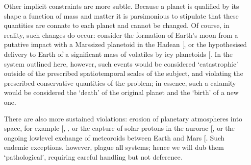 \documentclass[letterpaper,10pt,english]{jupyterBook}
\begin{document}
\sphinxAtStartPar
Other implicit constraints are more subtle. Because a planet is qualified by its shape \sphinxhyphen{} a function of mass and matter \sphinxhyphen{} it is parsimonious to stipulate that these quantities are connate to each planet and cannot be changed. Of course, in reality, such changes do occur: consider the formation of Earth’s moon from a putative impact with a Mars\sphinxhyphen{}sized planetoid in the Hadean {[}\sphinxcite{references:id117}{]}, or the hypothesised delivery to Earth of a significant mass of volatiles by icy planetoids {[}\sphinxcite{references:id116}{]}. In the system outlined here, however, such events would be considered ‘catastrophic’ \sphinxhyphen{} outside of the prescribed spatiotemporal scales of the subject, and violating the prescribed conservative quantities of the problem; in essence, such a calamity would be considered the ‘death’ of the original planet and the ‘birth’ of a new one.

\sphinxAtStartPar
There are also more sustained violations: erosion of planetary atmospheres into space, for example {[}, \sphinxcite{references:id113}{]}, or the capture of solar protons in the aurorae {[}\sphinxcite{references:id114}{]}, or the ongoing low\sphinxhyphen{}level exchange of meteoroids between Earth and Mars {[}\sphinxcite{references:id115}{]}. Such endemic exceptions, however, plague all systems; hence we will dub them ‘pathological’, requiring careful handling but not deference.
\end{document}
